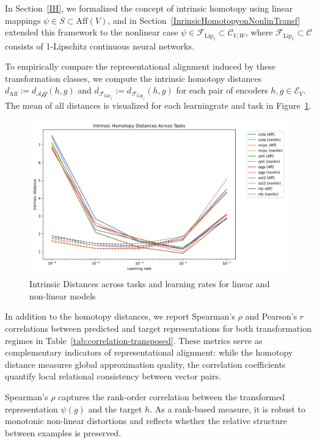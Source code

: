 In Section~\ref{IH}, we formalized the concept of intrinsic homotopy using linear mappings \( \psi \in S \subset \text{Aff}(V) \), and in Section~\ref{InrinsicHomotopyonNonlinTransf} extended this framework to the nonlinear case \( \psi \in  \mathcal{F}_{\text{Lip}_1} \subset \mathcal{C}_{V,W} \), where \(  \mathcal{F}_{\text{Lip}_1} \subset \mathcal{C} \) consists of 1-Lipschitz continuous neural networks.

To empirically compare the representational alignment induced by these transformation classes, we compute the intrinsic homotopy distances \( d_{\mathrm{Aff}} := d_{\mathcal{\text{Aff}}}(h, g) \) and \( d_{\mathcal{F}_{\mathrm{Lip}_1}} := d_{\mathcal{F}_{\mathrm{Lip}_1}}(h, g) \) for each pair of encoders \( h, g \in \mathcal{E}_V \).
The mean of all distances is visualized for each learningrate and task in Figure~\ref{fig:lin_vs_nonlind_dist}.

\begin{figure}[h]
    \centering
    \includegraphics[width=\linewidth]{Abschlussarbeit/Pictures/intrinsic_distance_all_tasks.png}
    \caption{Intrinsic Distances across tasks and learning rates for linear and non-linear models}
    \label{fig:lin_vs_nonlind_dist}
\end{figure}

In addition to the homotopy distances, we report Spearman’s $\rho$ and Pearson’s $r$ correlations between predicted and target representations for both transformation regimes in Table~\ref{tab:correlation-transposed}.  
These metrics serve as complementary indicators of representational alignment: while the homotopy distance measures global approximation quality, the correlation coefficients quantify local relational consistency between vector pairs.

Spearman’s $\rho$ captures the rank-order correlation between the transformed representation $\psi(g)$ and the target $h$. 
As a rank-based measure, it is robust to monotonic non-linear distortions and reflects whether the relative structure between examples is preserved.

